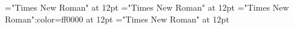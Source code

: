 \documentclass[a4paper]{article}
\begin{document}
 
\pagestyle{plain} 
\sloppy 
\setlength{\parfillskip}{0pt plus 1fil} 
\font{}="Times New Roman" at 12pt
\font\cletHeaddicBody="Times New Roman" at 12pt
\font\aletHeaddicBody="Times New Roman":color=ff0000 at 12pt
\font\bletHeaddicBody="Times New Roman" at 12pt

\pagestyle{fancy} 

\end{document}
